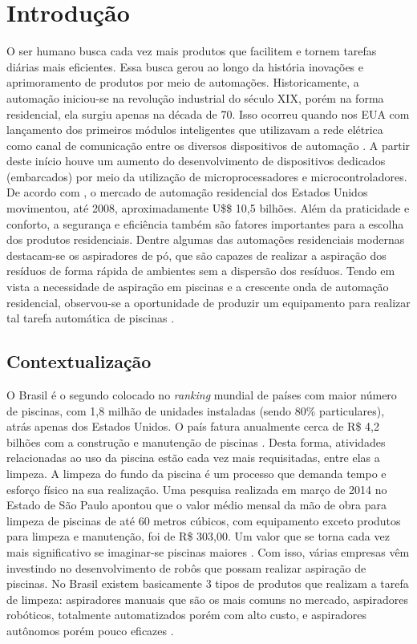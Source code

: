 
\chapter{Introdução}
O ser humano busca cada vez mais produtos que facilitem e tornem tarefas 
diárias mais eficientes. Essa busca gerou ao longo da história inovações e 
aprimoramento de produtos por meio de automações. Historicamente, a automação 
iniciou-se na revolução industrial do século XIX, porém na forma residencial, 
ela surgiu apenas na década de 70. Isso ocorreu quando nos EUA com lançamento dos primeiros 
módulos inteligentes que utilizavam a rede elétrica como canal de comunicação 
entre os diversos dispositivos de automação \cite{bortoluzzi2013}. A partir deste início 
houve um aumento do desenvolvimento de dispositivos dedicados (embarcados) por 
meio da utilização de microprocessadores e microcontroladores. De acordo com 
, o mercado de automação residencial dos Estados Unidos 
movimentou, até 2008, aproximadamente U\$\$ 10,5 bilhões. Além da praticidade 
e conforto, a segurança e eficiência também são fatores importantes para a 
escolha dos produtos residenciais. Dentre algumas das automações residenciais 
modernas destacam-se os aspiradores de pó, que são capazes de realizar a 
aspiração dos resíduos de forma rápida de ambientes sem a dispersão dos 
resíduos. Tendo em vista a necessidade de aspiração em piscinas e a crescente 
onda de automação residencial, observou-se a oportunidade de produzir um 
equipamento para realizar tal tarefa automática de piscinas \cite{kanno2014}.

\section{Contextualização}
O Brasil é o segundo colocado no \textit{ranking} mundial de países com maior número de 
piscinas, com 1,8 milhão de unidades instaladas (sendo 80\% particulares), 
atrás apenas dos Estados Unidos. O país fatura anualmente cerca de R\$ 4,2 
bilhões com a construção e manutenção de piscinas \cite{portalfatorbrasil2013}. Desta 
forma, atividades relacionadas ao uso da piscina estão cada vez mais 
requisitadas, entre elas a limpeza. A limpeza do fundo da piscina é um processo
que demanda tempo e esforço físico na sua realização. Uma pesquisa realizada 
em  março de 2014 no Estado de São Paulo apontou que o valor médio mensal da 
mão de obra para limpeza de piscinas de até 60 metros cúbicos, com equipamento exceto 
produtos para limpeza e manutenção,  foi de R\$ 303,00. Um valor que se torna 
cada vez mais significativo se imaginar-se piscinas maiores \cite{datafolha2014}. 
Com isso, várias empresas vêm investindo no desenvolvimento de robôs que possam
realizar aspiração de piscinas. No Brasil existem basicamente 3 tipos de 
produtos que realizam a tarefa de limpeza: aspiradores manuais que são os mais 
comuns no mercado, aspiradores robóticos, totalmente automatizados porém com 
alto custo, e aspiradores autônomos porém pouco eficazes \cite{miura2006}.

